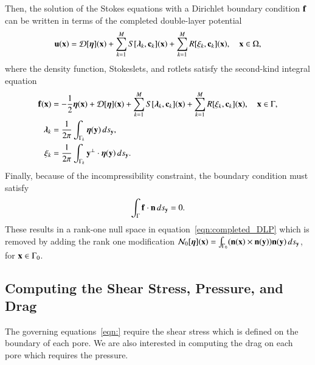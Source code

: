 \documentclass[preprint, 10pt]{elsarticle}
\begin{document}
Then, the solution of the Stokes equations with a Dirichlet boundary
condition ${\mathbf{f}}$ can be written in terms of the completed double-layer
potential
\begin{align}
  {\mathbf{u}}({\mathbf{x}}) = {\mathcal{D}}[{\boldsymbol\eta}]({\mathbf{x}}) + \sum_{k=1}^{M} S[{\boldsymbol\lambda}_k,{\mathbf{c}}_k]({\mathbf{x}}) +
              \sum_{k=1}^{M} R[\xi_k,{\mathbf{c}}_k]({\mathbf{x}}), \quad {\mathbf{x}} \in \Omega,
  \label{eqn:completedDLP}
\end{align}
where the density function, Stokeslets, and rotlets satisfy the
second-kind integral equation
\begin{align}
  {\mathbf{f}}({\mathbf{x}}) &= -\frac{1}{2}{\boldsymbol\eta}({\mathbf{x}}) + {\mathcal{D}}[{\boldsymbol\eta}]({\mathbf{x}}) + 
      \sum_{k=1}^{M} S[{\boldsymbol\lambda}_k,{\mathbf{c}}_k]({\mathbf{x}}) +
      \sum_{k=1}^{M} R[\xi_k,{\mathbf{c}}_k]({\mathbf{x}}), \quad {\mathbf{x}} \in \Gamma, \\
  {\boldsymbol\lambda}_k &= \frac{1}{2\pi}\int_{\Gamma_k} {\boldsymbol\eta}({\mathbf{y}}) \, ds_{\mathbf{y}}, \\
  \xi_k &= \frac{1}{2\pi}\int_{\Gamma_k} {\mathbf{y}}^\perp \cdot {\boldsymbol\eta}({\mathbf{y}})
  \, ds_{\mathbf{y}}.
  \label{eqn:completed_DLP}
\end{align}
Finally, because of the incompressibility constraint, the boundary
condition must satisfy 
\begin{align}
  \int_{\Gamma} {\mathbf{f}} \cdot {\mathbf{n}} \, ds_{\mathbf{y}} = 0.
\end{align}
These results in a rank-one null space in
equation~\eqref{eqn:completed_DLP} which is removed by adding the rank
one modification ${\mathcal{N}}_0[{\boldsymbol\eta}]({\mathbf{x}}) = \int_{\Gamma_0} ({\mathbf{n}}({\mathbf{x}}) \times
{\mathbf{n}}({\mathbf{y}})){\mathbf{n}}({\mathbf{y}}) \, ds_{\mathbf{y}}$, for ${\mathbf{x}} \in \Gamma_0$.




\subsection{Computing the Shear Stress, Pressure, and Drag} 
The governing equations~\eqref{eqn:} require the shear stress which is
defined on the boundary of each pore.  We are also interested in
computing the drag on each pore which requires the pressure.
\end{document}
